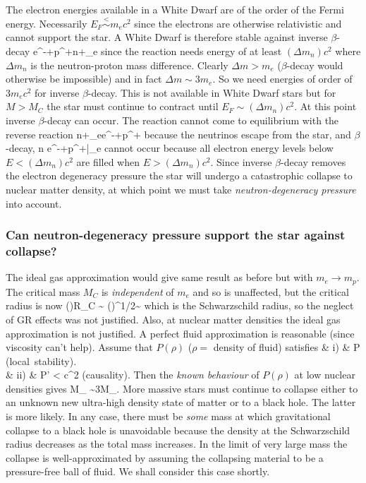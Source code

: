 The electron energies available in a White Dwarf are of the order of the 
Fermi energy.  Necessarily $E_F\stackrel{\scriptstyle <}{\scriptstyle \sim}
m_ec^2$ since the electrons are otherwise relativistic and cannot support the
star.  A White Dwarf is therefore stable against inverse $\beta$-decay
\be
e^-+p^+\to n+\nu_e
\ee
since the reaction needs energy of at least $(\Delta m_n)c^2$ where $\Delta m_n$ is the neutron-proton mass difference.  Clearly $\Delta m > m_e$ ($\beta$-decay would otherwise be impossible) and in fact $\Delta m\sim 3m_e$.  So we need energies of order of $3m_ec^2$ for inverse $\beta$-decay.  This is not available in White Dwarf stars but for $M>M_C$ the star must continue to contract until $E_F\sim (\Delta m_n)c^2$.  At this point inverse $\beta$-decay can occur.  The reaction cannot come to equilibrium with the reverse reaction
\be
n+\nu_e\to e^-+p^+
\ee 
because the neutrinos escape from the star, and $\beta$-decay, 
\be
n \to e^-+p^+\bar{\nu}_e
\ee
cannot occur because all electron energy levels below $E<(\Delta m_n)c^2$ are 
filled when $E>(\Delta m_n)c^2$.  Since inverse $\beta$-decay removes the
electron degeneracy pressure the star will undergo a catastrophic collapse to
nuclear matter density, at which point we must take \emph{neutron-degeneracy
pressure} into account.

\subsubsection{Can neutron-degeneracy pressure support the star against 
collapse?}

The ideal gas approximation would give same result as before but with 
$m_e\to m_p$.  The critical mass $M_C$ is \emph{independent} of $m_e$ and so is
unaffected, but the critical radius is now
\be
\left(\right)R_C \sim {}
\left(\right)^{1/2}\sim {}
\ee
which is the Schwarzschild radius, so the neglect of GR effects was
not justified.  Also, at nuclear matter densities the ideal gas approximation is
not justified.  A perfect fluid approximation is reasonable (since viscosity
can't help).  Assume that $P(\rho)$ ($\rho=$ density of fluid) satisfies
\bea
& \mbox{i)} & P \quad \mbox{(local stability).} \\
& \mbox{ii)} & P' < c^2 \quad \mbox{(causality).} 
\eea
Then the \emph{known behaviour} of $P(\rho)$ at low nuclear densities gives
\be
M_{} \sim 3M_{\odot}.
\ee
More massive stars must continue to collapse either to an unknown new  
ultra-high density state of matter or to a black hole. The latter is more
likely. In any case, there must be {\it some} mass at which gravitational
collapse to a black hole is unavoidable because the density at the
Schwarzschild radius decreases as the total mass increases. In the limit of
very large mass the collapse is well-approximated by assuming the collapsing
material to be a pressure-free ball of fluid. We shall consider this
case shortly.
